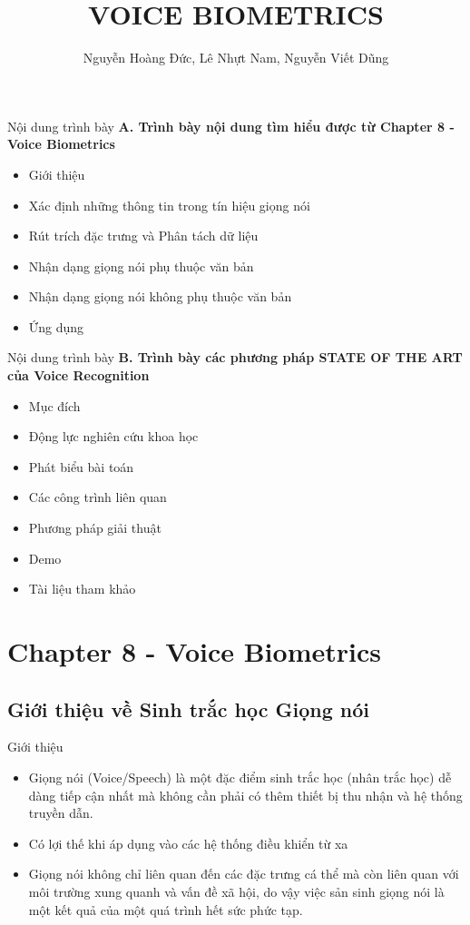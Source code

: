\documentclass[11pt]{beamer}
\author{Nguyễn Hoàng Đức, Lê Nhựt Nam, Nguyễn Viết Dũng}
\title{VOICE BIOMETRICS}
\institute{Đại học Khoa học Tự nhiên, Đại học Quốc Gia TP HCM}
\begin{document}
\begin{frame}
\titlepage
\end{frame}
\begin{frame}{Nội dung trình bày}
	\textbf{A. Trình bày nội dung tìm hiểu được từ Chapter 8 - Voice Biometrics}
	\begin{itemize}
		\item Giới thiệu
		\item Xác định những thông tin trong tín hiệu giọng nói
		\item Rút trích đặc trưng và Phân tách dữ liệu
		\item Nhận dạng giọng nói phụ thuộc văn bản
		\item Nhận dạng giọng nói không phụ thuộc văn bản
		\item Ứng dụng
	\end{itemize}
\end{frame}
\begin{frame}{Nội dung trình bày}
	\textbf{B. Trình bày các phương pháp STATE OF THE ART của Voice Recognition}
	\begin{itemize}
		\item Mục đích
		\item Động lực nghiên cứu khoa học 
		\item Phát biểu bài toán
		\item Các công trình liên quan
		\item Phương pháp giải thuật
		\item Demo
		\item Tài liệu tham khảo
	\end{itemize}
\end{frame}

\section{Chapter 8 - Voice Biometrics}
\subsection{Giới thiệu về Sinh trắc học Giọng nói}
\begin{frame}{Giới thiệu}
	\begin{itemize}
		\item Giọng nói (Voice/Speech) là một đặc điểm sinh trắc học (nhân trắc học) dễ dàng tiếp cận nhất mà không cần phải có thêm thiết bị thu nhận và hệ thống truyền dẫn.
		\item Có lợi thế khi áp dụng vào các hệ thống điều khiển từ xa
		\item Giọng nói không chỉ liên quan đến các đặc trưng cá thể mà còn liên quan với môi trường xung quanh và vấn đề xã hội, do vậy việc sản sinh giọng nói là một kết quả của một quá trình hết sức phức tạp.
	\end{itemize}
\end{frame}
\end{document}
